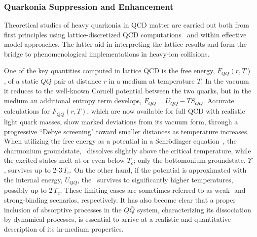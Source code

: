 \subsubsection{Quarkonia Suppression and Enhancement}
\label{Sec:Quarkonia}


Theoretical studies of heavy quarkonia in QCD matter are carried out both from first 
principles using lattice-discretized QCD computations~\cite{Bazavov:2009us,Kaczmarek:2012ne} 
and within  effective model approaches. The latter aid in interpreting the lattice results and 
form the bridge to phenomenological implementations in heavy-ion collisions.

One of the key quantities computed in lattice QCD is the free energy, $F_{Q\bar Q}(r,T)$, 
of a static $Q\bar Q$ pair at distance $r$ in a medium at temperature $T$. In the vacuum it reduces to the well-known Cornell 
potential between the two quarks, but in the medium an additional entropy term develops, 
$F_{Q\bar Q}= U_{Q\bar Q} - T S_{Q\bar Q}$. Accurate calculations for $F_{Q\bar Q}(r,T)$, which are 
now available for full QCD with realistic light quark masses, show marked deviations from 
its vacuum form, through a progressive ``Debye screening" toward smaller distances 
as temperature increases. When utilizing the free energy as a potential in a Schr\"odinger 
equation~\cite{Digal:2001iu}, the charmonium groundstate, \Jpsi\, dissolves slightly above 
the critical temperature, while the excited states melt at or even below $T_{c}$; only the 
bottomonium groundstate, $\Upsilon$, survives up to 2-3\,$T_c$. On the other hand, if the 
potential is approximated with the internal energy, $U_{Q\bar Q}$, the \Jpsi\ survives to 
significantly higher temperatures, possibly up to 2\,$T_c$. These limiting cases are sometimes 
referred to as weak- and strong-binding scenarios, respectively. It has also become clear 
that a proper inclusion of absorptive processes in the $Q\bar Q$ system, characterizing its 
dissociation by dynamical processes, is essential to arrive at a realistic and quantitative description 
of its in-medium properties. 


